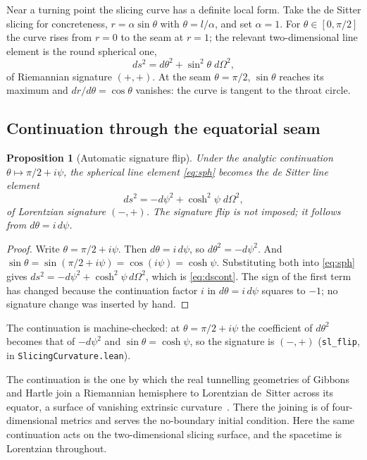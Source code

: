 \documentclass[11pt,a4paper]{article}
\newtheorem{proposition}[theorem]{Proposition}
\theoremstyle{definition}
\begin{document}
Near a turning point the slicing curve has a definite local form. Take the de Sitter slicing for concreteness, $r=\alpha\sin\theta$ with $\theta=l/\alpha$, and set $\alpha=1$. For $\theta\in[0,\pi/2]$ the curve rises from $r=0$ to the seam at $r=1$; the relevant two-dimensional line element is the round spherical one,
\begin{equation}\label{eq:sph}
  ds^{2}=d\theta^{2}+\sin^{2}\!\theta\;d\Omega^{2},
\end{equation}
of Riemannian signature $(+,+)$. At the seam $\theta=\pi/2$, $\sin\theta$ reaches its maximum and $d r/d\theta=\cos\theta$ vanishes: the curve is tangent to the throat circle.

\subsection{Continuation through the equatorial seam}

\begin{proposition}[Automatic signature flip]\label{prop:flip}
Under the analytic continuation $\theta\mapsto\pi/2+i\psi$, the spherical line element \eqref{eq:sph} becomes the de Sitter line element
\begin{equation}\label{eq:dscont}
  ds^{2}=-d\psi^{2}+\cosh^{2}\!\psi\;d\Omega^{2},
\end{equation}
of Lorentzian signature $(-,+)$. The signature flip is not imposed; it follows from $d\theta=i\,d\psi$.
\end{proposition}

\begin{proof}
Write $\theta=\pi/2+i\psi$. Then $d\theta=i\,d\psi$, so $d\theta^{2}=-d\psi^{2}$. And $\sin\theta=\sin(\pi/2+i\psi)=\cos(i\psi)=\cosh\psi$. Substituting both into \eqref{eq:sph} gives $ds^{2}=-d\psi^{2}+\cosh^{2}\psi\,d\Omega^{2}$, which is \eqref{eq:dscont}. The sign of the first term has changed because the continuation factor $i$ in $d\theta=i\,d\psi$ squares to $-1$; no signature change was inserted by hand.
\end{proof}

The continuation is machine-checked: at $\theta=\pi/2+i\psi$ the coefficient of $d\theta^{2}$ becomes that of $-d\psi^{2}$ and $\sin\theta=\cosh\psi$, so the signature is $(-,+)$ (\texttt{sl\_flip}, in \texttt{SlicingCurvature.lean}).

The continuation is the one by which the real tunnelling geometries of Gibbons and Hartle join a Riemannian hemisphere to Lorentzian de~Sitter across its equator, a surface of vanishing extrinsic curvature~\cite{GibbonsHartle1990}. There the joining is of four-dimensional metrics and serves the no-boundary initial condition. Here the same continuation acts on the two-dimensional slicing surface, and the spacetime is Lorentzian throughout.
\end{document}
